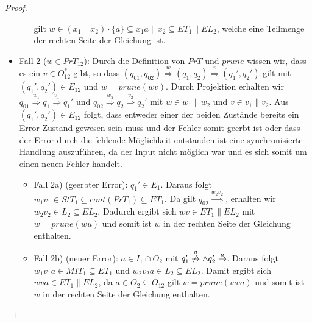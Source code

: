 \begin{proof}
\begin{itemize}
\begin{itemize}
      gilt $w\in (x_1\| x_2)\cdot\{a\}\subseteq x_1a\|x_2\subseteq ET_1\|EL_2$,
      welche eine Teilmenge der rechten Seite der Gleichung ist.
  \end{itemize}
    \item Fall 2 ($w\in PrT_{12}$): Durch die Definition von $PrT$ und $prune$
      wissen wir, dass es ein $v\in O_{12}^*$ gibt, so dass $(q_{01},q_{02})
      \overset{w}{\Rightarrow} (q_1,q_2) \overset{v}{\Rightarrow} (q_1',q_2')$
      gilt mit $(q_1',q_2')\in E_{12}$ und $w=prune(wv)$. Durch Projektion
      erhalten wir $q_{01} \overset{w_1}{\Rightarrow} q_1
      \overset{v_1}{\Rightarrow} q_1'$ und $q_{02} \overset{w_2}{\Rightarrow}
      q_2 \overset{v_2}{\Rightarrow} q_2'$ mit $w\in w_1\|w_2$ und $v\in
      v_1\|v_2$. Aus $(q_1',q_2')\in E_{12}$ folgt, dass entweder einer der
      beiden Zustände bereits ein Error-Zustand gewesen sein muss und der Fehler
      somit geerbt ist oder dass der Error durch die fehlende Möglichkeit
      entstanden ist eine synchronisierte Handlung auszuführen, da der Input
      nicht möglich war und es sich somit um einen neuen Fehler handelt.
      \begin{itemize}
        \item Fall 2a) (geerbter Error): \oBdA{} $q_1'\in E_1$. Daraus folgt
          $w_1v_1\in StT_1\subseteq cont(PrT_1)\subseteq ET_1$. Da gilt
          $q_{02}\overset{w_2v_2}{\Rightarrow}$, erhalten wir $w_2v_2\in
          L_2\subseteq EL_2$. Dadurch ergibt sich $wv\in ET_1\|EL_2$ mit
          $w=prune(wu)$ und somit ist $w$ in der rechten Seite der Gleichung
          enthalten.
        \item Fall 2b) (neuer Error): \oBdA{} $a\in I_1\cap O_2$ mit
          $q_1'\overset{a}{\not{\hspace{-0.1cm}\rightarrow}} \wedge q_2'
          \overset{a}{\rightarrow}$. Daraus folgt $w_1v_1a\in MIT_1\subseteq
          ET_1$ und $w_2v_2a\in L_2\subseteq EL_2$. Damit ergibt sich $wva\in
          ET_1\|EL_2$, da $a\in O_2\subseteq O_{12}$ gilt $w=prune(wva)$ und
          somit ist $w$ in der rechten Seite der Gleichung enthalten.
      \end{itemize}
  \end{itemize}


\end{proof}
